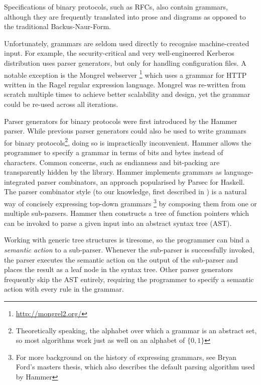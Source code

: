\documentclass{article}
\begin{document}
Specifications of binary protocols, such as RFCs, also contain grammars, although they are
frequently translated into prose and diagrams as opposed to the traditional Backus-Naur-Form.  

Unfortunately, grammars are seldom used directly to recognise machine-created input. For example,
the security-critical and very well-engineered Kerberos distribution \cite{kerberos} uses parser
generators, but only for handling configuration files. A notable exception is the Mongrel
webserver \footnote{\url{http://mongrel2.org/}} which uses a grammar for HTTP written in the
Ragel \cite{ragel-paper} regular expression language. Mongrel was re-written from scratch multiple
times to achieve better scalability and design, yet the grammar could be  re-used across all iterations\cite{patterson-citation}.

 Parser generators for binary protocols were first introduced by the Hammer\cite{hammer} parser.
 While previous parser generators could also be used to write grammars for binary
 protocols\footnote{Theoretically speaking, the alphabet over which a grammar is an  abstract set,
   so most algorithms work just as well on an alphabet of $\{0,1\}$}, doing so is impractically
 inconvenient. Hammer allows the programmer to specify a grammar in terms of bits and bytes instead
 of characters. Common concerns, such as endianness and bit-packing are transparently hidden by the
 library. Hammer implements grammars as language-integrated parser combinators, an approach
 popularised by Parsec for Haskell\cite{leijen2010parsec}. The parser combinator style (to our
 knowledge, first  described in \cite{burge-recursive}) is a natural way of concisely expressing
 top-down grammars \footnote{For more background on the history of expressing grammars, see Bryan
   Ford's masters thesis\cite{packrat}, which also describes the default parsing algorithm used by Hammer} by composing them from one or multiple sub-parsers. 
  Hammer then constructs a tree of function pointers which
 can be invoked to parse a given input into an abstract syntax tree (AST).
 
Working with generic tree structures is tiresome, so the programmer can bind a \textit{semantic action} to a
sub-parser. Whenever the sub-parser is successfully invoked, the parser executes the semantic action
on the output of the sub-parser and places the result as a leaf node in the syntax tree. Other
parser generators frequently skip the AST entirely, requiring the programmer to specify a semantic
action with every rule in the grammar. 
\end{document}
